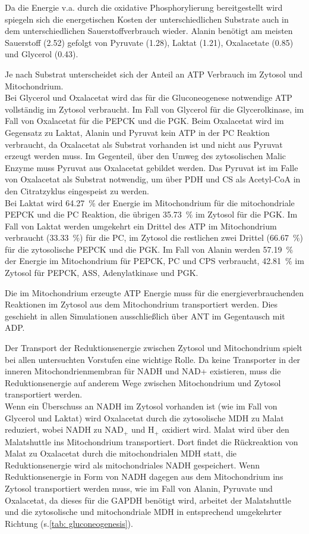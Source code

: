Da die Energie v.a. durch die oxidative Phosphorylierung bereitgestellt wird spiegeln sich die energetischen Kosten der unterschiedlichen Substrate auch in dem unterschiedlichen Sauerstoffverbrauch wieder. Alanin benötigt am meisten Sauerstoff (2.52) gefolgt von Pyruvate (1.28), Laktat (1.21), Oxalacetate (0.85) und Glycerol (0.43).

Je nach Substrat unterscheidet sich der Anteil an ATP Verbrauch im Zytosol und Mitochondrium.\\
Bei Glycerol und Oxalacetat wird das für die Gluconeogenese notwendige ATP vollständig im Zytosol verbraucht. Im Fall von Glycerol für die Glycerolkinase, im Fall von Oxalacetat für die PEPCK und die PGK. Beim Oxalacetat wird im Gegensatz zu Laktat, Alanin und Pyruvat kein ATP in der PC Reaktion verbraucht, da Oxalacetat als Substrat vorhanden ist und nicht aus Pyruvat erzeugt werden muss. Im Gegenteil, über den Umweg des zytosolischen Malic Enzyme muss Pyruvat aus Oxalacetat gebildet werden. Das Pyruvat ist im Falle von Oxalacetat als Substrat notwendig, um über PDH und CS als Acetyl-CoA in den Citratzyklus eingespeist zu werden.\\
Bei Laktat wird 64.27~\% der Energie im Mitochondrium für die mitochondriale PEPCK und die PC Reaktion, die übrigen 35.73~\% im Zytosol für die PGK. Im Fall von Laktat werden umgekehrt ein Drittel des ATP im Mitochondrium verbraucht (33.33~\%) für die PC, im Zytosol die restlichen zwei Drittel (66.67~\%) für die zytosolische PEPCK und die PGK. Im Fall von Alanin werden 57.19~\% der Energie im Mitochondrium für PEPCK, PC und CPS verbraucht, 42.81~\% im Zytosol für PEPCK, ASS, Adenylatkinase und PGK.

Die im Mitochondrium erzeugte ATP Energie muss für die energieverbrauchenden Reaktionen im Zytosol aus dem Mitochondrium transportiert werden. Dies geschieht in allen Simulationen ausschließlich über ANT im Gegentausch mit ADP.

Der Transport der Reduktionsenergie zwischen Zytosol und Mitochondrium spielt bei allen untersuchten Vorstufen eine wichtige Rolle. Da keine Transporter in der inneren Mitochondrienmembran für NADH und NAD+ existieren, muss die Reduktionsenergie auf anderem Wege zwischen Mitochondrium und Zytosol transportiert werden.\\
Wenn ein Überschuss an NADH im Zytosol vorhanden ist (wie im Fall von Glycerol und Laktat) wird Oxalacetat durch die zytosolische MDH zu Malat reduziert, wobei NADH zu $\text{NAD}_+$ und $\text{H}_+$ oxidiert wird. Malat wird über den Malatshuttle ins Mitochondrium transportiert. Dort findet die Rückreaktion von Malat zu Oxalacetat durch die mitochondrialen MDH statt, die Reduktionsenergie wird als mitochondriales NADH gespeichert. Wenn Reduktionsenergie in Form von NADH dagegen aus dem Mitochondrium ins Zytosol transportiert werden muss, wie im Fall von Alanin, Pyruvate und Oxalacetat, da dieses für die GAPDH benötigt wird, arbeitet der Malatshuttle und die zytosolische und mitochondriale MDH in entsprechend umgekehrter Richtung (s.\ref{tab: gluconeogenesis}).

